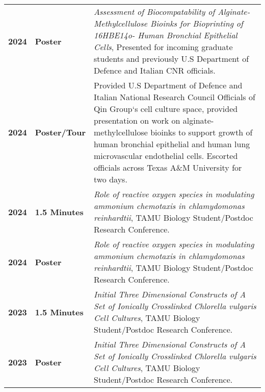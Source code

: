 \documentclass[11pt]{article}
\begin{document}
\section*{\color{secondary}{Presentations}}
	\begin{longtable}{p{}p{}p{}}
		\textbf{2024} & \textbf{Poster} & {\emph{Assessment of Biocompatability
                        of Alginate-Methylcellulose Bioinks for Bioprinting of 16HBE14o- 
                        Human Bronchial Epithelial Cells}, Presented for incoming
                        graduate students and previously U.S Department of Defence
			and Italian CNR officials.} \\ 
		\textbf{2024} & \textbf{Poster/Tour} & Provided U.S Department of 
                        Defence and Italian National Research Council Officials of
                        Qin Group`s cell culture space, provided presentation
                        on work on alginate-methylcellulose bioinks to support
                        growth of human bronchial epithelial and human lung
                        microvascular endothelial cells. Escorted officials across
			Texas A\&M University for two days. \\ 
		\textbf{2024} & \textbf{1.5 Minutes} & \emph{Role of reactive oxygen
			species in modulating ammonium chemotaxis in chlamydomonas reinhardtii},
			TAMU Biology Student/Postdoc Research Conference. \\ 
		\textbf{2024} & \textbf{Poster} &  \emph{Role of reactive oxygen
			species in modulating ammonium chemotaxis in chlamydomonas reinhardtii},
			TAMU Biology Student/Postdoc Research Conference. \\ 
		\textbf{2023} & \textbf{1.5 Minutes} & \emph{Initial Three
                        Dimensional Constructs of A Set of Ionically
                        Crosslinked Chlorella vulgaris Cell Cultures},
                        TAMU Biology Student/Postdoc Research
                        Conference. \\ 
		\textbf{2023} & \textbf{Poster} & \emph{Initial Three
                        Dimensional Constructs of A Set of Ionically
                        Crosslinked Chlorella vulgaris Cell Cultures},
                        TAMU Biology Student/Postdoc Research
                        Conference. \\ 

	\end{longtable}
\end{document}

